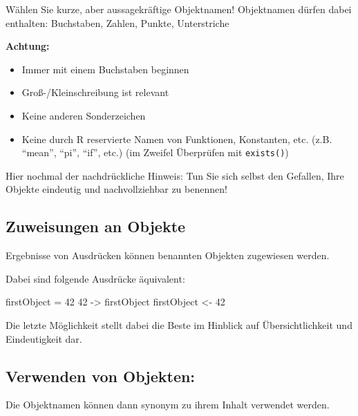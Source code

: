 \documentclass[
]{book}
\newenvironment{Shaded}{\begin{snugshade}}{\end{snugshade}}
\newcommand{\DecValTok}[1]{\textcolor[rgb]{0.00,0.00,0.81}{#1}}
\newcommand{\NormalTok}[1]{#1}
\newcommand{\OtherTok}[1]{\textcolor[rgb]{0.56,0.35,0.01}{#1}}
\providecommand{\tightlist}{%
  \setlength{\itemsep}{0pt}\setlength{\parskip}{0pt}}
\begin{document}
Wählen Sie kurze, aber aussagekräftige Objektnamen! Objektnamen dürfen dabei enthalten: Buchstaben, Zahlen, Punkte, Unterstriche

\textbf{Achtung:}

\begin{itemize}
\tightlist
\item
  Immer mit einem Buchstaben beginnen
\item
  Groß-/Kleinschreibung ist relevant
\item
  Keine anderen Sonderzeichen
\item
  Keine durch R reservierte Namen von Funktionen, Konstanten, etc. (z.B. ``mean'', ``pi'', ``if'', etc.) (im Zweifel Überprüfen mit \texttt{exists()})
\end{itemize}

Hier nochmal der nachdrückliche Hinweis: Tun Sie sich selbst den Gefallen, Ihre Objekte eindeutig und nachvollziehbar zu benennen!

\hypertarget{zuweisungen-an-objekte}{%
\subsection*{Zuweisungen an Objekte}\label{zuweisungen-an-objekte}}

Ergebnisse von Ausdrücken können benannten Objekten zugewiesen werden.

Dabei sind folgende Ausdrücke äquivalent:

\begin{Shaded}
\begin{Highlighting}[]
\NormalTok{firstObject }\OtherTok{=} \DecValTok{42}
\DecValTok{42} \OtherTok{{-}\textgreater{}}\NormalTok{ firstObject}
\NormalTok{firstObject }\OtherTok{\textless{}{-}} \DecValTok{42}
\end{Highlighting}
\end{Shaded}

Die letzte Möglichkeit stellt dabei die Beste im Hinblick auf Übersichtlichkeit und Eindeutigkeit dar.

\hypertarget{verwenden-von-objekten}{%
\subsection*{Verwenden von Objekten:}\label{verwenden-von-objekten}}

Die Objektnamen können dann synonym zu ihrem Inhalt verwendet werden.
\end{document}
